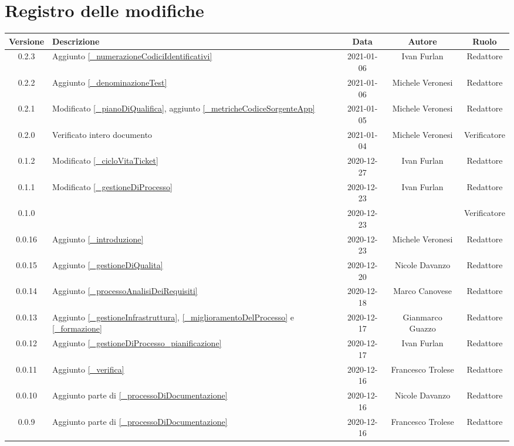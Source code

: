 \section*{Registro delle modifiche}

\begin{center}
	\begin{longtable}{|c|p{5cm}|c|c|c|}
		\hline
		\rowcolor{lighter-grayer}
		\textbf{Versione} & \textbf{Descrizione} & \textbf{Data} & \textbf{Autore} & \textbf{Ruolo} \\
		\hline
		\endfirsthead

		0.2.3 & Aggiunto \ref{_numerazioneCodiciIdentificativi} & 2021-01-06 & Ivan Furlan & Redattore \\
		0.2.2 & Aggiunto \ref{_denominazioneTest} & 2021-01-06 & Michele Veronesi & Redattore \\
		0.2.1 & Modificato \ref{_pianoDiQualifica}, aggiunto \ref{_metricheCodiceSorgenteApp} & 2021-01-05 & Michele Veronesi & Redattore \\
		0.2.0 & Verificato intero documento & 2021-01-04 & Michele Veronesi & Verificatore \\
		0.1.2 & Modificato \ref{_cicloVitaTicket} & 2020-12-27& Ivan Furlan & Redattore \\
		0.1.1 & Modificato \ref{_gestioneDiProcesso} & 2020-12-23 & Ivan Furlan & Redattore \\
		0.1.0 &  & 2020-12-23 &  & Verificatore \\
		0.0.16 & Aggiunto \ref{_introduzione} & 2020-12-23 & Michele Veronesi & Redattore \\
		0.0.15 & Aggiunto \ref{_gestioneDiQualita} & 2020-12-20 & Nicole Davanzo & Redattore \\
		0.0.14 & Aggiunto \ref{_processoAnalisiDeiRequisiti} & 2020-12-18 & Marco Canovese & Redattore \\
		0.0.13 & Aggiunto \ref{_gestioneInfrastruttura}, \ref{_miglioramentoDelProcesso} e \ref{_formazione} & 2020-12-17 & Gianmarco Guazzo & Redattore \\
		0.0.12 & Aggiunto \ref{_gestioneDiProcesso_pianificazione} & 2020-12-17 & Ivan Furlan & Redattore \\
		0.0.11 & Aggiunto \ref{_verifica} & 2020-12-16 & Francesco Trolese & Redattore \\
		0.0.10 & Aggiunto parte di \ref{_processoDiDocumentazione} & 2020-12-16 & Nicole Davanzo & Redattore \\
		0.0.9 & Aggiunto parte di \ref{_processoDiDocumentazione} & 2020-12-16 & Francesco Trolese & Redattore \\

\end{longtable}
\end{center}
